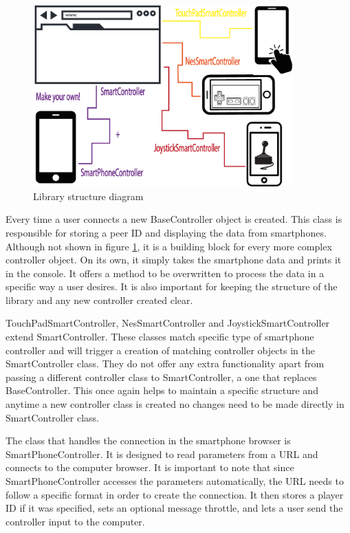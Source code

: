 \documentclass{l4proj}
\begin{document}
\begin{figure}[h!]
    \centering
    \includegraphics[width = 10cm]{./images/All.png}
    \caption{Library structure diagram}
    \label{fig:libdia}
\end{figure}

\pagebreak
Every time a user connects a new BaseController object is created. This class is responsible for storing a peer ID and displaying the data from smartphones. Although not shown in figure \ref{fig:libdia}, it is a building block for every more complex controller object. On its own, it simply takes the smartphone data and prints it in the console. It offers a method to be overwritten to process the data in a specific way a user desires. It is also important for keeping the structure of the library and any new controller created clear. \par

TouchPadSmartController, NesSmartController and JoystickSmartController extend SmartController. These classes match specific type of smartphone controller and will trigger a creation of matching controller objects in the SmartController class. They do not offer any extra functionality apart from passing a different controller class to SmartController, a one that replaces BaseController. This once again helps to maintain a specific structure and anytime a new controller class is created no changes need to be made directly in SmartController class. \par 

The class that handles the connection in the smartphone browser is SmartPhoneController. It is designed to read parameters from a URL and connects to the computer browser. It is important to note that since SmartPhoneController accesses the parameters automatically, the URL needs to follow a specific format in order to create the connection. It then stores a player ID if it was specified, sets an optional message throttle, and lets a user send the controller input to the computer. \par
\end{document}
